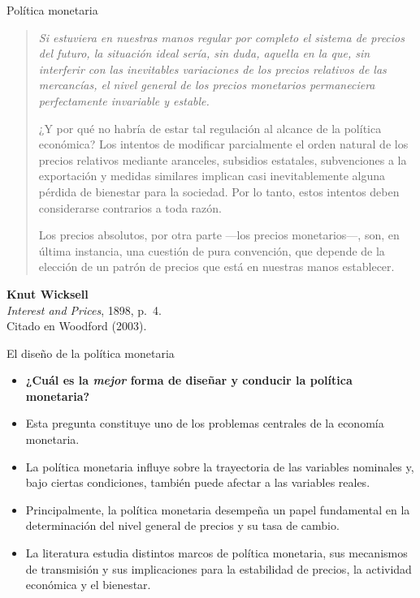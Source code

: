 \documentclass[aspectratio=169,11pt]{beamer}
\newcommand{\cidehighlight}[1]{\textcolor{CIDEBlue}{\bfseries #1}}
\begin{document}
\begin{frame}{Política monetaria}
  \footnotesize
  \begin{quote}
    \itshape
    Si estuviera en nuestras manos regular por completo el sistema
    de precios del futuro, la situación ideal sería, sin duda,
    aquella en la que, sin interferir con las inevitables
    variaciones de los precios relativos de las mercancías,
    el nivel general de los precios monetarios permaneciera
    perfectamente invariable y estable.

    \medskip

    ¿Y por qué no habría de estar tal regulación al alcance
    de la política económica? Los intentos de modificar
    parcialmente el orden natural de los precios relativos
    mediante aranceles, subsidios estatales, subvenciones
    a la exportación y medidas similares implican casi
    inevitablemente alguna pérdida de bienestar para la sociedad.
    Por lo tanto, estos intentos deben considerarse contrarios
    a toda razón.

    \medskip

    Los precios absolutos, por otra parte ---los precios
    monetarios---, son, en última instancia, una cuestión
    de pura convención, que depende de la elección de un
    patrón de precios que está en nuestras manos establecer.
\end{quote}
\begin{flushright}
\footnotesize
    \textbf{Knut Wicksell}\\
    \textit{Interest and Prices}, 1898, p.~4.\\
    \footnotesize{Citado en Woodford (2003).}
\end{flushright}
\end{frame}



\begin{frame}{El diseño de la política monetaria}
  \small
  \begin{itemize}
    \setlength{\itemsep}{0.55em}

    \item \cidehighlight{¿Cuál es la \textit{mejor} forma de diseñar y conducir la política monetaria?}

    \item Esta pregunta constituye uno de los problemas centrales de la economía monetaria.

    \item La política monetaria influye sobre la trayectoria de las variables nominales y, bajo ciertas condiciones, también puede afectar a las variables reales.

    \item Principalmente, la política monetaria desempeña un papel fundamental en la determinación del nivel general de precios y su tasa de cambio.

    \item La literatura estudia distintos marcos de política monetaria, sus mecanismos de transmisión y sus implicaciones para la estabilidad de precios, la actividad económica y el bienestar.
  \end{itemize}
\end{frame}
\end{document}
